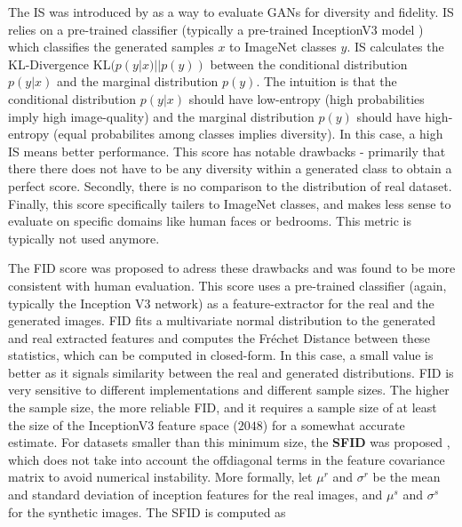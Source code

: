 The \ac{IS} was introduced by \cite{improved_techniques_gans} as a way to evaluate 
\ac{GAN}s for diversity and fidelity. \ac{IS} relies on a pre-trained classifier 
(typically a pre-trained InceptionV3 model \citep{szegedy2016rethinking}) which classifies the 
generated samples $x$ to ImageNet classes $y$. \ac{IS} calculates the \ac{KL}-Divergence $\mathrm{KL}(p(y|x) || p(y))$ between the 
conditional distribution $p(y|x)$  and the marginal distribution $p(y)$.
The intuition 
is that the conditional distribution $p(y|x)$ should have low-entropy (high probabilities 
imply high image-quality)
and the marginal distribution $p(y)$ should have high-entropy (equal probabilites 
among classes implies diversity). In this case, 
a high \ac{IS} means better performance. This score has notable drawbacks - 
primarily that there there does not have to be any diversity within a generated class 
to obtain a perfect score. Secondly, there is no comparison to the distribution of 
real dataset. Finally, this score specifically tailers to ImageNet classes, and 
makes less sense to evaluate on specific domains like human faces or bedrooms. This metric
 is typically not used anymore.

\label{sec:related_fid}


The \ac{FID} score \citep{heusel2017gans} was proposed to adress these drawbacks and 
was found to be more consistent with human evaluation. This score uses a pre-trained 
classifier (again, typically the Inception V3 network) as a feature-extractor for the 
real and the generated images.  \ac{FID}
fits a multivariate normal distribution to the generated and real extracted features and 
computes the Fréchet Distance between these statistics, which can be computed in closed-form.
In this case, a small value is better as it signals similarity between the real and generated 
distributions. \ac{FID} is very sensitive to different implementations and different sample sizes. 
The higher the sample size, the more reliable \ac{FID}, and it requires a sample size of at least 
the size of the InceptionV3 feature space ($2048$) for a somewhat accurate estimate. 
For datasets smaller than this minimum size, the \textbf{\ac{SFID}} was proposed 
\citep{kim2020simplified}, which does
 not take into account the offdiagonal terms in the feature covariance matrix
 to avoid numerical instability. 
 More formally, let $\mu^r$ and $\sigma^r$ be the mean and standard deviation of 
inception features for the real images, and $\mu^s$ and $\sigma^s$ for the synthetic 
images. The \ac{SFID} \cite{kim2020simplified} is computed as 


